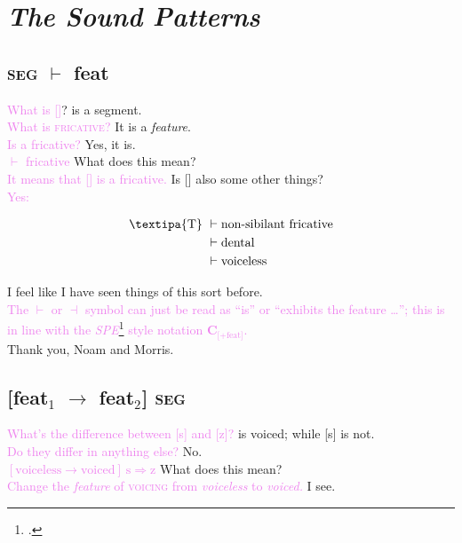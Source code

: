 \documentclass{report}[12pt]
\begin{document}
\section{\emph{The Sound Patterns}}

\subsection*{\textsc{seg} $\vdash$ feat}

\begin{tcolorbox}
  \textcolor{violet}{What is []}? \quad [\textipa{T}] is a segment. \\
  \textcolor{violet}{What is \textsc{fricative}?} \quad It is a \emph{feature}. \\
  \textcolor{violet}{Is  a fricative?} \quad Yes, it is. \\
  \textcolor{violet}{ $\vdash$ fricative} \quad What does this mean? \\
  \textcolor{violet}{It means that [] is a fricative.} \quad Is [] also some other things? \\  
  \textcolor{violet}{Yes:}
  \begin{tcolorbox}
    \begin{align*}
    \text{\textipa{T}}\ & \vdash \text{non-sibilant fricative} \\
                      & \vdash \text{dental} \\
                      & \vdash \text{voiceless} 
    \end{align*}
  \end{tcolorbox}
  I feel like I have seen things of this sort before. \\
  \textcolor{violet}{The $\vdash$ or $\dashv$ symbol can just be read as ``is'' or ``exhibits the feature \dots''; this is in line with the \emph{SPE}\footcite{spe} style notation $\textbf{C}_{\text{[+feat]}}$.} \\ 
  Thank you, Noam and Morris. \\
\end{tcolorbox}

\subsection*{[feat$_1$ $\rightarrow$ feat$_2$] \textsc{seg}}

\begin{tcolorbox}
  \textcolor{violet}{What's the difference between [s] and [z]?} \quad [z] is voiced; while [s] is not. \\
  \textcolor{violet}{Do they differ in anything else?} \quad No. \\
  \textcolor{violet}{$[\text{voiceless} \rightarrow \text{voiced}]\ \text{s} \Rightarrow \text{z}$} \quad What does this mean? \\
  \textcolor{violet}{Change the \emph{feature} of \textsc{voicing} from \emph{voiceless} to \emph{voiced.}} \quad I see. \\  
\end{tcolorbox}
\end{document}
